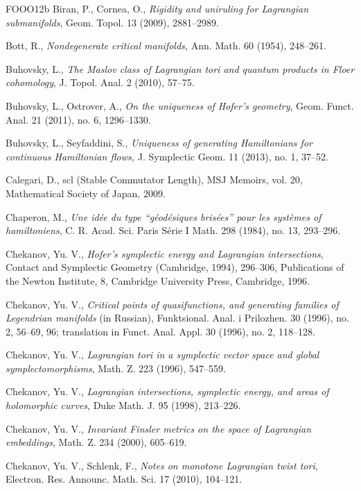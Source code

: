 \begin{thebibliography}{FOOO12b}
 Biran, P., Cornea, O., \emph{Rigidity and uniruling for Lagrangian
  submani\-folds}, Geom. Topol. 13 (2009), 2881–2989.

 Bott, R., \emph{Nondegenerate critical manifolds,} Ann. Math. 60 (1954), 248–261.

 Buhovsky, L., \emph{The Maslov class of Lagrangian tori and quantum prod\-ucts in
  Floer cohomology}, J. Topol. Anal. 2 (2010), 57–75.

 Buhovsky, L., Ostrover, A., \emph{On the uniqueness of Hofer’s geometry}, Geom.
  Funct. Anal. 21 (2011), no. 6, 1296–1330.

 Buhovsky, L., Seyfaddini, S., \emph{Uniqueness of generating Hamiltonians for
  continuous Hamiltonian flows,} J. Symplectic Geom. 11 (2013), no. 1, 37–52.

 Calegari, D., scl (Stable Commutator Length), MSJ Memoirs, vol. 20, Mathematical
  Society of Japan, 2009.

 Chaperon, M., \emph{Une idée du type “géodésiques brisées” pour les systèmes of
  hamiltoniens}, C. R. Acad. Sci. Paris Série I Math. 298 (1984), no. 13, 293–296.

 Chekanov, Yu. V., \emph{Hofer’s symplectic energy and Lagrangian intersec\-tions},
  Contact and Symplectic Geometry (Cambridge, 1994), 296–306, Publications of the Newton Institute, 8,
  Cambridge University Press, Cambridge, 1996.

 Chekanov, Yu. V., \emph{Critical points of quasifunctions, and generating
  fami\-lies of Legendrian manifolds} (in Russian), Funktsional. Anal. i Prilozhen. 30 (1996), no. 2,
  56–69, 96; translation in Funct. Anal. Appl. 30 (1996), no. 2, 118–128.

 Chekanov, Yu. V., \emph{Lagrangian tori in a symplectic vector space and global
  symplectomorphisms}, Math. Z. 223 (1996), 547–559.

 Chekanov, Yu. V., \emph{Lagrangian intersections, symplectic energy, and areas of
  holomorphic curves}, Duke Math. J. 95 (1998), 213–226.

 Chekanov, Yu. V., \emph{Invariant Finsler metrics on the space of Lagrangian
  embeddings}, Math. Z. 234 (2000), 605–619.

 Chekanov, Yu. V., Schlenk, F., \emph{Notes on monotone Lagrangian twist tori},
  Electron. Res. Announc. Math. Sci. 17 (2010), 104–121.


\end{thebibliography}

